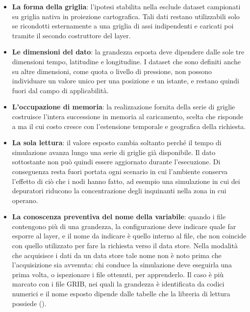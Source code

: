 \begin{itemize}
  \item \textbf{La forma della griglia}: l'ipotesi stabilita nella
   esclude dataset campionati su griglia
  nativa in proiezione cartografica. Tali dati restano utilizzabili solo se
  ricondotti esternamente a una griglia di assi indipendenti e caricati poi
  tramite il secondo costruttore del layer.

  \item \textbf{Le dimensioni del dato}: la grandezza esposta deve
  dipendere dalle sole tre dimensioni tempo, latitudine e longitudine. I dataset
  che sono definiti anche su altre dimensioni, come quota o livello di pressione,
  non possono individuare un valore unico per una posizione e un istante, e restano
  quindi fuori dal campo di applicabilità.

  \item \textbf{L'occupazione di memoria}: la realizzazione fornita della serie
  di griglie costruisce l'intera successione in memoria al caricamento,
  scelta che risponde a  ma il cui costo cresce con l'estensione temporale
  e geografica della richiesta.

  \item \textbf{La sola lettura}: il valore esposto cambia soltanto perché il
  tempo di simulazione avanza lungo una serie di griglie già disponibile. Il dato
  sottostante non può quindi essere aggiornato durante l'esecuzione.
  Di conseguenza resta fuori portata ogni
  scenario in cui l'ambiente conserva l'effetto di ciò che i nodi hanno fatto,
  ad esempio una simulazione in cui dei depuratori riducono la concentrazione
  degli inquinanti nella zona in cui operano.

  \item \textbf{La conoscenza preventiva del nome della variabile}: quando i file
  contengono più di una grandezza, la configurazione deve indicare quale far esporre
  al layer, e il nome da indicare è quello interno al file, che non coincide
  con quello utilizzato per fare la richiesta verso il data store.
  Nella modalità che acquisisce i dati da un data store tale nome non è noto prima
  che l'acquisizione sia avvenuta: chi conduce la simulazione deve eseguirla una
  prima volta, o ispezionare i file ottenuti, per apprenderlo. Il caso è più marcato
  con i file GRIB, nei quali la grandezza è identificata da codici numerici e il
  nome esposto dipende dalle tabelle che la libreria di lettura possiede
  ().
\end{itemize}

